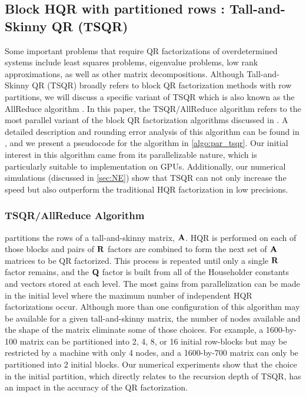 \subsection{Block HQR with partitioned rows : Tall-and-Skinny QR (TSQR)}\label{sec:TSQR}
Some important problems that require QR factorizations of overdetermined systems include least squares problems, eigenvalue problems, low rank approximations, as well as other matrix decompositions.
Although Tall-and-Skinny QR (TSQR) broadly refers to block QR factorization methods with row partitions, we will discuss a specific variant of TSQR which is also known as the AllReduce algorithm \cite{Mori2012}.
In this paper, the TSQR/AllReduce algorithm refers to the most parallel variant of the block QR factorization algorithms discussed in \cite{Demmel2012}.
A detailed description and rounding error analysis of this algorithm can be found in \cite{Mori2012}, and we present a pseudocode for the algorithm in \cref{algo:par_tsqr}.
Our initial interest in this algorithm came from its parallelizable nature, which is particularly suitable to implementation on GPUs. 
Additionally, our numerical simulations (discussed in \cref{sec:NE}) show that TSQR can not only increase the speed but also outperform the traditional HQR factorization in low precisions.
\subsubsection{TSQR/AllReduce Algorithm}
 partitions the rows of a tall-and-skinny matrix, $\mathbf{A}$. 
HQR is performed on each of those blocks and pairs of $\mathbf{R}$ factors are combined to form the next set of $\mathbf{A}$ matrices to be QR factorized. 
This process is repeated until only a single $\mathbf{R}$ factor remains, and the $\mathbf{Q}$ factor is built from all of the Householder constants and vectors stored at each level.
The most gains from parallelization can be made in the initial level where the maximum number of independent HQR factorizations occur. 
Although more than one configuration of this algorithm may be available for a given tall-and-skinny matrix, the number of nodes available and the shape of the matrix eliminate some of those choices. 
For example, a 1600-by-100 matrix can be partitioned into 2, 4, 8, or 16 initial row-blocks but may be restricted by a machine with only 4 nodes, and a 1600-by-700 matrix can only be partitioned into 2 initial blocks.
Our numerical experiments show that the choice in the initial partition, which directly relates to the recursion depth of TSQR, has an impact in the accuracy of the QR factorization. \par

